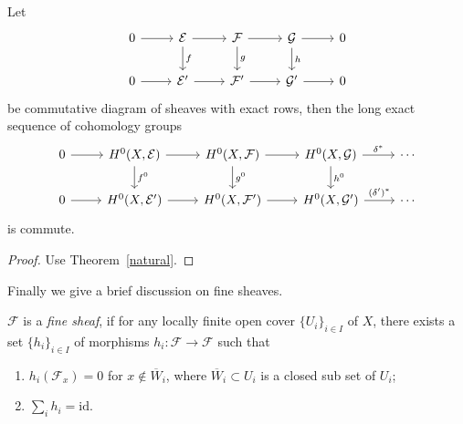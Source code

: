 \begin{thm}
    Let
    \[\begin{tikzcd}
        0\ar[r] & \mathcal{E} \ar[r]\ar[d, "f"] & \mathcal{F} \ar[r]\ar[d, "g"] & \mathcal{G} \ar[r]\ar[d, "h"] & 0 \\
        0\ar[r] & \mathcal{E}' \ar[r] & \mathcal{F}'\ar[r] & \mathcal{G}' \ar[r] & 0
    \end{tikzcd}\]
    be commutative diagram of sheaves with exact rows, then the long exact sequence of cohomology groups
    \[\begin{tikzcd}
        0 \ar[r] & H^0(X,\mathcal{E}) \ar[r] \ar[d, "f^0"] & H^0(X,\mathcal{F}) \ar[r] \ar[d, "g^0"] & H^0(X,\mathcal{G}) \ar[r, "\delta^*"] \ar[d, "h^0"] & \cdots\\
        0 \ar[r] & H^0(X,\mathcal{E}') \ar[r] & H^0(X,\mathcal{F}') \ar[r] & H^0(X,\mathcal{G}') \ar[r, "(\delta')^*"] & \cdots
    \end{tikzcd}\]
    is commute.
\end{thm}
\begin{proof}
    Use Theorem~\ref{natural}.
\end{proof}

Finally we give a brief discussion on fine sheaves.

\begin{defn}
    $\mathcal{F}$ is a \emph{fine sheaf}, if for any locally finite open cover $\{U_i\}_{i\in I}$ of $X$, there exists a set $\{h_i\}_{i\in I}$ of morphisms $h_i:\mathcal{F}\to\mathcal{F}$ such that
    \begin{enumerate}[(1)]
        \item $h_i(\mathcal{F}_x)=0$ for $x\notin\overline{W}_i$, where $\overline{W}_i\subset U_i$ is a closed sub set of $U_i$;
        \item $\sum_ih_i=\mathrm{id}$.
    \end{enumerate}
\end{defn}


